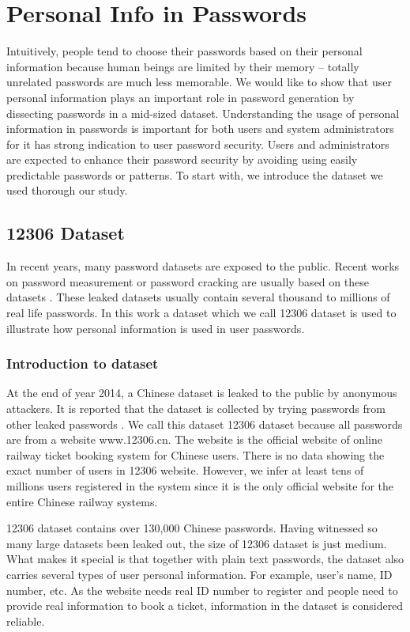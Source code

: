 \section{Personal Info in Passwords}
\label{personalinfo}
Intuitively, people tend to choose their passwords based on their personal information because human beings are limited by their memory -- totally unrelated passwords are much less memorable. We would like to show that user personal information plays an important role in password generation by dissecting passwords in a mid-sized dataset. Understanding the usage of personal information in passwords is important for both users and system administrators for it has strong indication to user password security. Users and administrators are expected to enhance their password security by avoiding using easily predictable passwords or patterns. To start with, we introduce the dataset we used thorough our study. 

\subsection{12306 Dataset}
In recent years, many password datasets are exposed to the public. Recent works on password measurement or password cracking are usually based on these datasets \cite{bonneau2012science}\cite{li2014large}. These leaked datasets usually contain several thousand to millions of real life passwords. In this work a dataset which we call 12306 dataset is used to illustrate how personal information is used in user passwords.

\subsubsection{Introduction to dataset}
At the end of year 2014, a Chinese dataset is leaked to the public by anonymous attackers. It is reported that the dataset is collected by trying passwords from other leaked passwords \cite{tencentnews}. We call this dataset 12306 dataset because all passwords are from a website www.12306.cn. The website is the official website of online railway ticket booking system for Chinese users. There is no data showing the exact number of users in 12306 website. However, we infer at least tens of millions users registered in the system since it is the only official website for the entire Chinese railway systems.

12306 dataset contains over 130,000 Chinese passwords. Having witnessed so many large datasets been leaked out, the size of 12306 dataset is just medium. What makes it special is that together with plain text passwords, the dataset also carries several types of user personal information. For example, user's name, ID number, etc. As the website needs real ID number to register and people need to provide real information to book a ticket, information in the dataset is considered reliable.

